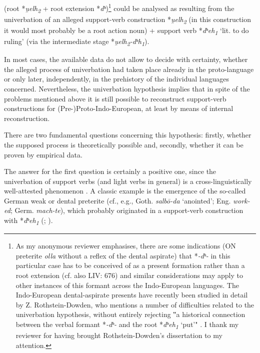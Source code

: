 \documentclass[output=paper,colorlinks,citecolor=brown]{langscibook}
\begin{document}
(root *\textit{u̯elh\textsubscript{2}} + root extension *\textit{dʰ})\footnote{As my anonymous reviewer emphasises, there are some indications (ON preterite \textit{olla} without a reflex of the dental aspirate) that *\textit{-dʰ-} in this particular case has to be conceived of as a present formation rather than a root extension (cf. also LIV: 676) and similar considerations may apply to other instances of this formant across the Indo-European languages. The Indo-European dental-aspirate presents have recently been studied in detail by Z. Rothstein-Dowden, who mentions a number of difficulties related to the univerbation hypothesis, without entirely rejecting ‟a historical connection between the verbal formant *\textit{-dʰ-} and the root *\textit{dʰeh\textsubscript{1}} ‘put’" \citep[3--4 with n. 3]{RothsteinDowden2022}. I thank my reviewer for having brought Rothstein-Dowden’s dissertation to my attention.}                    could be analysed as resulting from the univerbation of an alleged support-verb construction *\textit{u̯elh\textsubscript{2}} (in this construction it would most probably be a root action noun) + support verb *\textit{dʰeh\textsubscript{1}} ‘lit. to do ruling’ (via the intermediate stage *\textit{u̯elh\textsubscript{2}-dʰh\textsubscript{1}}).

In most cases, the available data do not allow to decide with certainty, whether the alleged process of univerbation had taken place already in the proto-language or only later, independently, in the prehistory of the individual languages concerned. Nevertheless, the univerbation hypothesis implies that in spite of the problems mentioned above it is still possible to reconstruct support-verb constructions for (Pre-)Proto-Indo-European, at least by means of internal reconstruction.

There are two fundamental questions concerning this hypothesis: firstly, whether the supposed process is theoretically possible and, secondly, whether it can be proven by empirical data. 

The answer for the first question is certainly a positive one, since the univerbation of support verbs (and light verbs in general) is a cross-linguistically well-attested phenomenon \citep[175--176]{Bowern2008}. A classic example is the emergence of the so-called German weak or dental preterite (cf., e.g., Goth. \textit{salbō-da} ‘anointed’; Eng. \textit{work-ed}; Germ. \textit{mach-te}), which probably originated in a support-verb construction with *\textit{dʰeh\textsubscript{1}} (\citealt{Hill2010}; \citealt[69--72]{Schutzeichel2014}).
\end{document}
